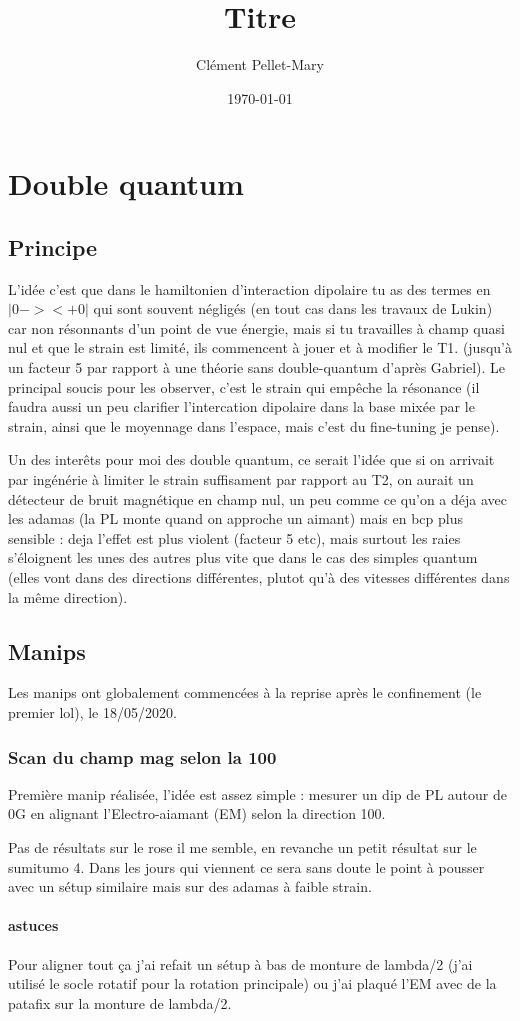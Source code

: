 \documentclass[a4paper]{report}
\title{Titre}
\author{Clément Pellet-Mary}
\date\today
\begin{document}
\chapter{Double quantum}
  \section{Principe}
  L'idée c'est que dans le hamiltonien d’interaction dipolaire tu as des termes en $|0-><+0|$ qui sont souvent négligés (en tout cas dans les travaux de Lukin) car non résonnants d'un point de vue énergie, mais si tu travailles à champ quasi nul et que le strain est limité, ils commencent à jouer et à modifier le T1. (jusqu'à un facteur 5 par rapport à une théorie sans double-quantum d'après Gabriel).
  Le principal soucis pour les observer, c'est le strain qui empêche la résonance (il faudra aussi un peu clarifier l'intercation dipolaire dans la base mixée par le strain, ainsi que le moyennage dans l'espace, mais c'est du fine-tuning je pense).
  
  Un des interêts pour moi des double quantum, ce serait l'idée que si on arrivait par ingénérie à limiter le strain suffisament par rapport au T2, on aurait un détecteur de bruit magnétique en champ nul, un peu comme ce qu'on a déja avec les adamas (la PL monte quand on approche un aimant) mais en bcp plus sensible : deja l'effet est plus violent (facteur 5 etc), mais surtout les raies s'éloignent les unes des autres plus vite que dans le cas des simples quantum (elles vont dans des directions différentes, plutot qu'à des vitesses différentes dans la même direction).
  
  \section{Manips}
  Les manips ont globalement commencées à la reprise après le confinement (le premier lol), le 18/05/2020.
  \subsection{Scan du champ mag selon la 100}
  Première manip réalisée, l'idée est assez simple : mesurer un dip de PL autour de 0G en alignant l'Electro-aiamant (EM) selon la direction 100.
  
  Pas de résultats sur le rose il me semble, en revanche un petit résultat sur le sumitumo 4. Dans les jours qui viennent ce sera sans doute le point à pousser avec un sétup similaire mais sur des adamas à faible strain.
  \subsubsection{astuces}
  Pour aligner tout ça j'ai refait un sétup à bas de monture de lambda/2 (j'ai utilisé le socle rotatif pour la rotation principale) ou j'ai plaqué l'EM avec de la patafix sur la monture de lambda/2. 
  
\end{document}
